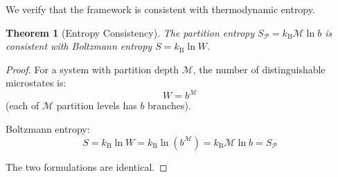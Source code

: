 \documentclass[twocolumn,10pt,a4paper]{article}
\newtheorem{theorem}{Theorem}[section]
\theoremstyle{definition}
\theoremstyle{remark}
\newcommand{\kB}{k_{\mathrm{B}}}
\newcommand{\Partition}{\mathcal{P}}
\newcommand{\Depth}{\mathcal{M}}
\begin{document}
We verify that the framework is consistent with thermodynamic entropy.

\begin{theorem}[Entropy Consistency]
The partition entropy $S_{\Partition} = \kB \Depth \ln b$ is consistent with Boltzmann entropy $S = \kB \ln W$.
\end{theorem}

\begin{proof}
For a system with partition depth $\Depth$, the number of distinguishable microstates is:
\begin{equation}
    W = b^{\Depth}
\end{equation}
(each of $\Depth$ partition levels has $b$ branches).

Boltzmann entropy:
\begin{equation}
    S = \kB \ln W = \kB \ln(b^{\Depth}) = \kB \Depth \ln b = S_{\Partition}
\end{equation}

The two formulations are identical.
\end{proof}



\end{document}
